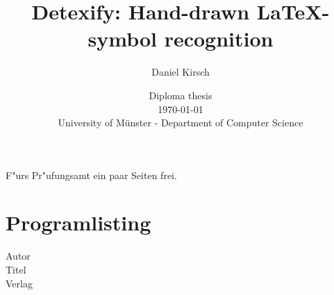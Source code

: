 \documentclass[12pt]{book}
\begin{document}
\frontmatter

\title{Detexify: Hand-drawn \LaTeX-symbol recognition}

\author{Daniel Kirsch}

\date{\vspace{10mm} Diploma thesis\\ \vspace{3mm} \today \\
\vspace{20mm}
\vspace{3mm} University of Münster - Department of Computer Science}

\maketitle


\rule{0mm}{1mm}
\newpage
\rule{0mm}{1mm}
\newpage

F"urs Pr"ufungsamt ein paar Seiten frei.

\tableofcontents




\mainmatter


\newpage

\backmatter

\appendix




\chapter{Programlisting}

\begin{tiny}




\end{tiny}

\begin{thebibliography}{90}

Autor\\
Titel\\
Verlag\\

\end{thebibliography}


\end{document}
